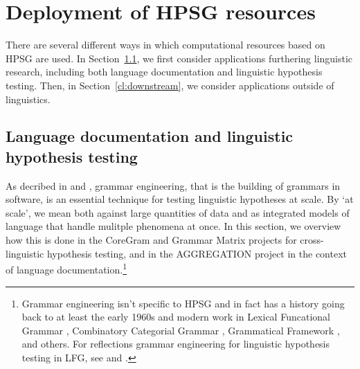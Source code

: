 \documentclass[output=paper,nonflat]{langsci/langscibook}
\begin{document}





\section{Deployment of HPSG resources}
\label{cl:deployment}

There are several different ways in which computational resources
based on HPSG are used.
In Section~\ref{cl:lang-doc}, we first consider applications furthering linguistic research,
including both language documentation and linguistic hypothesis testing.
Then, in Section~\ref{cl:downstream}, we consider applications outside of linguistics.


\subsection{Language documentation and linguistic hypothesis testing}
\label{cl:lang-doc}

As decribed in \citealt{Mueller99a-Short,Bender2008c-Short} and \citealt{BFO2011a-u},
grammar engineering, that is the building of grammars in software, is
an essential technique for testing linguistic hypotheses at scale. By
`at scale', we mean both against large quantities of data and as
integrated models of language that handle mulitple phenomena at
once. In this section, we overview how this is done in the CoreGram
and Grammar Matrix projects for cross-linguistic hypothesis testing,
and in the AGGREGATION project in the context of language
documentation.\footnote{Grammar engineering isn't specific to HPSG and
in fact has a history going back to at least the early 1960s \citep{Kay:63,ZFHW65a,Petrick65a-u,FBDPM71a-u}
and modern work in Lexical Funcational Grammar \citep{BKNS99a-ed}, Combinatory Categorial
Grammar \citep{BCPW2007a}, Grammatical Framework \citep{Ranta:09}, and others.
For reflections grammar engineering for linguistic hypothesis testing
in LFG, see \citealt{BKNS99a-ed} and \citealt{King:16}.}

\end{document}
